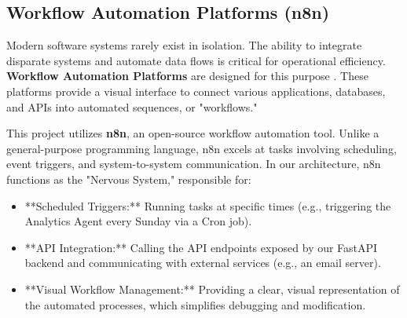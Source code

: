 \subsection{Workflow Automation Platforms (n8n)}
\label{subsec:n8n}

Modern software systems rarely exist in isolation. The ability to integrate disparate systems and automate data flows is critical for operational efficiency. \textbf{Workflow Automation Platforms} are designed for this purpose \cite{FIND_CITATION_PLEASE}. These platforms provide a visual interface to connect various applications, databases, and APIs into automated sequences, or "workflows."

This project utilizes \textbf{n8n}, an open-source workflow automation tool. Unlike a general-purpose programming language, n8n excels at tasks involving scheduling, event triggers, and system-to-system communication. In our architecture, n8n functions as the "Nervous System," responsible for:
\begin{itemize}
    \item **Scheduled Triggers:** Running tasks at specific times (e.g., triggering the Analytics Agent every Sunday via a Cron job).
    \item **API Integration:** Calling the API endpoints exposed by our FastAPI backend and communicating with external services (e.g., an email server).
    \item **Visual Workflow Management:** Providing a clear, visual representation of the automated processes, which simplifies debugging and modification.
\end{itemize}


